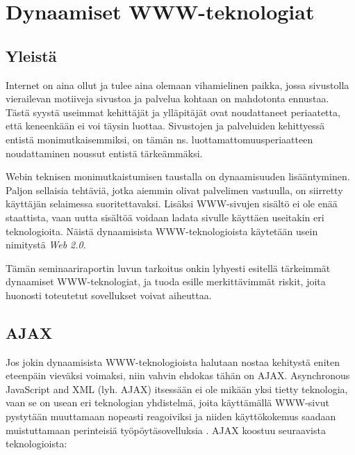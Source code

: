 
\ifdefined\seminaari
\relax
\else
\chapter{Dynaamiset WWW-teknologiat}
\fi


\section{Yleistä}

Internet on aina ollut ja tulee aina olemaan vihamielinen paikka, jossa sivustolla vierailevan motiiveja sivustoa ja palvelua kohtaan on mahdotonta ennustaa. Tästä syystä 
useimmat kehittäjät ja ylläpitäjät ovat noudattaneet periaatetta, että keneenkään ei voi täysin luottaa. Sivustojen ja palveluiden kehittyessä entistä monimutkaisemmiksi,
on tämän ns. luottamattomuusperiaatteen noudattaminen noussut entistä
tärkeämmäksi.

Webin teknisen monimutkaistumisen taustalla on dynaamisuuden
lisääntyminen. Paljon sellaisia tehtäviä, jotka aiemmin olivat
palvelimen vastuulla, on siirretty käyttäjän selaimessa
suoritettavaksi. Lisäksi WWW-sivujen sisältö ei ole enää staattista,
vaan uutta sisältöä voidaan ladata sivulle käyttäen useitakin eri
teknologioita. Näistä dynaamisista WWW-teknologioista käytetään
usein nimitystä \emph{Web 2.0}.

Tämän \ifdefined\seminaari seminaariraportin \else luvun \fi tarkoitus
onkin lyhyesti esitellä tärkeimmät dynaamiset WWW-teknologiat, ja
tuoda esille merkittävimmät riskit, joita huonosti toteutetut
sovellukset voivat aiheuttaa.

\section {AJAX}

Jos jokin dynaamisista WWW-teknologioista halutaan nostaa kehitystä
eniten eteenpäin vieväksi voimaksi, niin vahvin ehdokas tähän on AJAX.
Asynchronous JavaScript and XML (lyh. AJAX) itsessään ei ole mikään
yksi tietty teknologia, vaan se on usean eri teknologian yhdistelmä,
joita käyttämällä WWW-sivut pystytään muuttamaan nopeasti reagoiviksi
ja niiden käyttökokemus saadaan muistuttamaan perinteisiä
työpöytäsovelluksia \cite{AJAX}. AJAX koostuu seuraavista
teknologioista:

